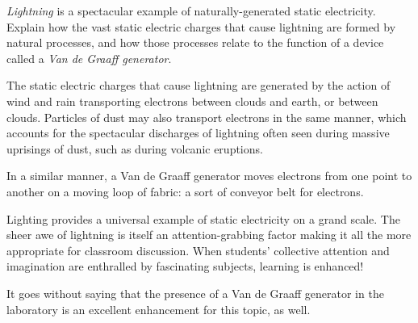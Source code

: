 

{\it Lightning} is a spectacular example of naturally-generated static electricity.  Explain how the vast static electric charges that cause lightning are formed by natural processes, and how those processes relate to the function of a device called a {\it Van de Graaff generator}.







The static electric charges that cause lightning are generated by the action of wind and rain transporting electrons between clouds and earth, or between clouds.  Particles of dust may also transport electrons in the same manner, which accounts for the spectacular discharges of lightning often seen during massive uprisings of dust, such as during volcanic eruptions.

In a similar manner, a Van de Graaff generator moves electrons from one point to another on a moving loop of fabric: a sort of conveyor belt for electrons.







Lighting provides a universal example of static electricity on a grand scale.  The sheer awe of lightning is itself an attention-grabbing factor making it all the more appropriate for classroom discussion.  When students' collective attention and imagination are enthralled by fascinating subjects, learning is enhanced!

It goes without saying that the presence of a Van de Graaff generator in the laboratory is an excellent enhancement for this topic, as well.




